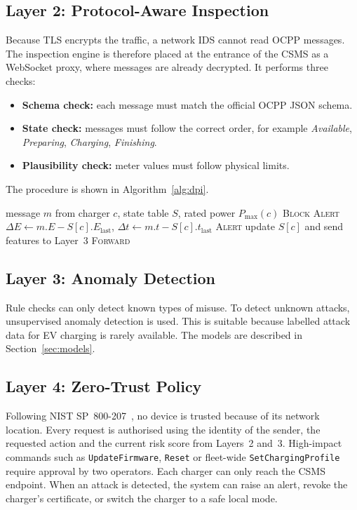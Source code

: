 \documentclass[runningheads]{llncs}
\begin{document}
\subsection{Layer 2: Protocol-Aware Inspection}
Because TLS encrypts the traffic, a network IDS cannot read OCPP messages. The inspection engine is therefore placed at the entrance of the CSMS as a WebSocket proxy, where messages are already decrypted. It performs three checks:
\begin{itemize}
  \item \textbf{Schema check:} each message must match the official OCPP JSON schema.
  \item \textbf{State check:} messages must follow the correct order, for example \emph{Available}, \emph{Preparing}, \emph{Charging}, \emph{Finishing}.
  \item \textbf{Plausibility check:} meter values must follow physical limits.
\end{itemize}
The procedure is shown in Algorithm~\ref{alg:dpi}.

\begin{algorithm}[t]
\caption{Inspection of an incoming OCPP message}
\label{alg:dpi}
\footnotesize
\begin{algorithmic}[1]
\Require message $m$ from charger $c$, state table $S$, rated power $P_{\max}(c)$
 \State \Return \textsc{Block} \EndIf
{} \State \Return \textsc{Alert} \EndIf
{}
  \State $\Delta E \gets m.E - S[c].E_{\mathrm{last}}$, \quad $\Delta t \gets m.t - S[c].t_{\mathrm{last}}$
   \State \Return \textsc{Alert} \EndIf
\EndIf
\State update $S[c]$ and send features to Layer~3
\State \Return \textsc{Forward}
\end{algorithmic}
\end{algorithm}

\subsection{Layer 3: Anomaly Detection}
Rule checks can only detect known types of misuse. To detect unknown attacks, unsupervised anomaly detection is used. This is suitable because labelled attack data for EV charging is rarely available. The models are described in Section~\ref{sec:models}.

\subsection{Layer 4: Zero-Trust Policy}
Following NIST SP~800-207~\cite{nist800207}, no device is trusted because of its network location. Every request is authorised using the identity of the sender, the requested action and the current risk score from Layers~2 and~3. High-impact commands such as \texttt{UpdateFirmware}, \texttt{Reset} or fleet-wide \texttt{SetChargingProfile} require approval by two operators. Each charger can only reach the CSMS endpoint. When an attack is detected, the system can raise an alert, revoke the charger's certificate, or switch the charger to a safe local mode.
\end{document}
